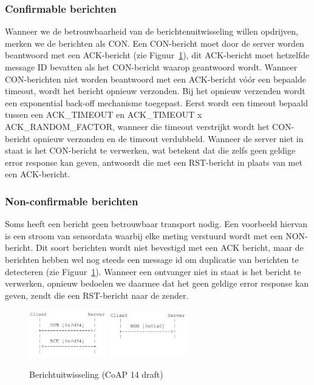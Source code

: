 \subsubsection{Confirmable berichten}

Wanneer we de betrouwbaarheid van de berichtenuitwisseling willen opdrijven, merken we de berichten als CON. Een CON-bericht moet door de server worden beantwoord met een ACK-bericht (zie Figuur~\ref{fig:berichtuitwisseling}), dit ACK-bericht moet hetzelfde message ID bevatten als het CON-bericht waarop geantwoord wordt. Wanneer CON-berichten niet worden beantwoord met een ACK-bericht v\'{o}\'{o}r een bepaalde timeout, wordt het bericht opnieuw verzonden. Bij het opnieuw verzenden wordt een exponential back-off mechanisme toegepast. Eerst wordt een timeout bepaald tussen een ACK\_TIMEOUT en ACK\_TIMEOUT x ACK\_RANDOM\_FACTOR, wanneer die timeout verstrijkt wordt het CON-bericht opnieuw verzonden en de timeout verdubbeld. Wanneer de server niet in staat is het CON-bericht te verwerken, wat betekent dat die zelfs geen geldige error response kan geven, antwoordt die met een RST-bericht in plaats van met een ACK-bericht.

\subsubsection{Non-confirmable berichten}

Soms heeft een bericht geen betrouwbaar transport nodig. Een voorbeeld hiervan is een stroom van sensordata waarbij elke meting verstuurd wordt met een NON-bericht. Dit soort berichten wordt niet bevestigd met een ACK bericht, maar de berichten hebben wel nog steeds een message id om duplicatie van berichten te detecteren (zie Figuur~\ref{fig:berichtuitwisseling}). Wanneer een ontvanger niet in staat is het bericht te verwerken, opnieuw bedoelen we daarmee dat het geen geldige error response kan geven, zendt die een RST-bericht naar de zender.

\begin{figure}[h]
\vspace{10pt}
\centering
{}
{\includegraphics[width=0.3\textwidth]{fig/CoAPConfirmable}}
\hspace{30pt}
{\includegraphics[width=0.3\textwidth]{fig/CoAPNonConfirmable}}
\caption{Berichtuitwisseling (CoAP 14 draft)}
\label{fig:berichtuitwisseling}
\end{figure}

